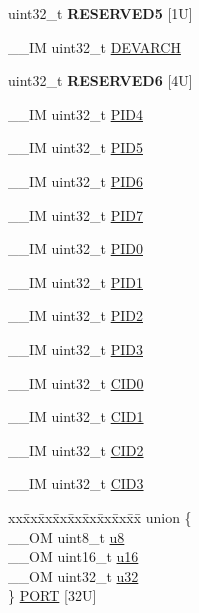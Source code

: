 \begin{DoxyCompactItemize}
\mbox{\label{struct_i_t_m___type_a14f6f27ef518e4bf31aabb8f17cf4229}} 
uint32\+\_\+t {\bfseries R\+E\+S\+E\+R\+V\+E\+D5} \mbox{[}1\+U\mbox{]}
\item 
\+\_\+\+\_\+\+IM uint32\+\_\+t \hyperlink{struct_i_t_m___type_a2372a4ebb63e36d1eb3fcf83a74fd537}{D\+E\+V\+A\+R\+CH}
\item 
\mbox{\label{struct_i_t_m___type_ae2fb450d0636c855ffb24185aed7f726}} 
uint32\+\_\+t {\bfseries R\+E\+S\+E\+R\+V\+E\+D6} \mbox{[}4\+U\mbox{]}
\item 
\+\_\+\+\_\+\+IM uint32\+\_\+t \hyperlink{struct_i_t_m___type_aad5e11dd4baf6d941bd6c7450f60a158}{P\+I\+D4}
\item 
\+\_\+\+\_\+\+IM uint32\+\_\+t \hyperlink{struct_i_t_m___type_af9085648bf18f69b5f9d1136d45e1d37}{P\+I\+D5}
\item 
\+\_\+\+\_\+\+IM uint32\+\_\+t \hyperlink{struct_i_t_m___type_ad34dbe6b1072c77d36281049c8b169f6}{P\+I\+D6}
\item 
\+\_\+\+\_\+\+IM uint32\+\_\+t \hyperlink{struct_i_t_m___type_a2bcec6803f28f30d5baf5e20e3517d3d}{P\+I\+D7}
\item 
\+\_\+\+\_\+\+IM uint32\+\_\+t \hyperlink{struct_i_t_m___type_ab4a4cc97ad658e9c46cf17490daffb8a}{P\+I\+D0}
\item 
\+\_\+\+\_\+\+IM uint32\+\_\+t \hyperlink{struct_i_t_m___type_a89ea1d805a668d6589b22d8e678eb6a4}{P\+I\+D1}
\item 
\+\_\+\+\_\+\+IM uint32\+\_\+t \hyperlink{struct_i_t_m___type_a8471c4d77b7107cf580587509da69f38}{P\+I\+D2}
\item 
\+\_\+\+\_\+\+IM uint32\+\_\+t \hyperlink{struct_i_t_m___type_af317d5e2d946d70e6fb67c02b92cc8a3}{P\+I\+D3}
\item 
\+\_\+\+\_\+\+IM uint32\+\_\+t \hyperlink{struct_i_t_m___type_a30bb2b166b1723867da4a708935677ba}{C\+I\+D0}
\item 
\+\_\+\+\_\+\+IM uint32\+\_\+t \hyperlink{struct_i_t_m___type_ac40df2c3a6cef02f90b4e82c8204756f}{C\+I\+D1}
\item 
\+\_\+\+\_\+\+IM uint32\+\_\+t \hyperlink{struct_i_t_m___type_a8000b92e4e528ae7ac4cb8b8d9f6757d}{C\+I\+D2}
\item 
\+\_\+\+\_\+\+IM uint32\+\_\+t \hyperlink{struct_i_t_m___type_a43451f43f514108d9eaed5b017f8d921}{C\+I\+D3}
\item 
\begin{tabbing}
xx\=xx\=xx\=xx\=xx\=xx\=xx\=xx\=xx\=\kill
union \{\\
\>\_\_OM uint8\_t \hyperlink{struct_i_t_m___type_ae773bf9f9dac64e6c28b14aa39f74275}{u8}\\
\>\_\_OM uint16\_t \hyperlink{struct_i_t_m___type_a962a970dfd286cad7f8a8577e87d4ad3}{u16}\\
\>\_\_OM uint32\_t \hyperlink{struct_i_t_m___type_a5834885903a557674f078f3b71fa8bc8}{u32}\\
\} \hyperlink{struct_i_t_m___type_a2fc80b848dc9408836b15f1672b69ff6}{PORT} \mbox{[}32U\mbox{]}\\


\end{tabbing}
\end{DoxyCompactItemize}

